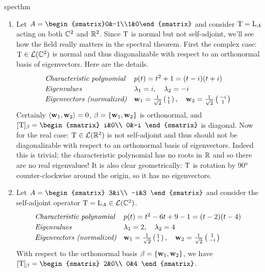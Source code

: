 \begin{examples}{}{specthm}
\begin{enumerate}
		\item Let $A=\begin{smatrix}0&-1\\1&0\end{smatrix}$ and consider $\mathrm{T}=\mathrm{L}_A$ acting on both $\mathbb{C}^2$ and $\mathbb{R}^2$. Since $\mathrm{T}$ is normal but not self-adjoint, we'll see how the field really matters in the spectral theorem.\smallbreak
		First the complex case: $\mathrm{T}\in\mathcal{L}(\mathbb{C}^2)$ is normal and thus diagonalizable with respect to an orthonormal basis of eigenvectors. Here are the details.
		\[
			\def\arraystretch{1.2}
			\begin{array}{@{}ll}
				\text{\emph{Characteristic polynomial}} &p(t)=t^2+1=(t-i)(t+i)\\
				\text{\emph{Eigenvalues}} &\lambda_1=i,\quad \lambda_2=-i\\
				\text{\emph{Eigenvectors (normalized)}} &\vw_1=\frac 1{\sqrt{2}}\stwovec{i}{1},\quad \vw_2=\frac 1{\sqrt{2}}\stwovec{-i}{1}
			\end{array}
		\]
		Certainly $\left\langle {\mathbf{w}}_1,{\mathbf{w}}_2\right\rangle=0$, $\beta=\{{\mathbf{w}}_1,{\mathbf{w}}_2\}$ is orthonormal, and $[\rT]_\beta=
		\begin{smatrix}
			i&0\\
			0&-i
		\end{smatrix}$
		is diagonal.\smallbreak	
		Now for the real case: $\mathrm{T}\in\mathcal{L}(\mathbb{R}^2)$ is not self-adjoint and thus should not be diagonalizable with respect to an orthonormal basis of eigenvectors. Indeed this is trivial; the characteristic polynomial has no roots in $\mathbb{R}$ and so there are no real eigenvalues! It is also clear geometrically: $\mathrm{T}$ is rotation by \ang{90} counter-clockwise around the origin, so it has no eigenvectors.
		
		\item Let $A=
		\begin{smatrix}
			3&i\\
			-i&3
		\end{smatrix}$ and consider the self-adjoint operator $\mathrm{T}=\mathrm{L}_A\in\mathcal{L}(\mathbb{C}^2)$.
		\[
			\def\arraystretch{1.2}
			\begin{array}{@{}ll}
				\text{\emph{Characteristic polynomial}} &p(t)=t^2-6t+9-1=(t-2)(t-4)\\
				\text{\emph{Eigenvalues}} &\lambda_1=2,\quad \lambda_2=4\\
				\text{\emph{Eigenvectors (normalized)}} &\vw_1=\frac 1{\sqrt{2}}\stwovec{1}{i},\quad \vw_2=\frac 1{\sqrt{2}}\stwovec{1}{-i}
			\end{array}
		\]
		With respect to the orthonormal basis $\beta=\{{\mathbf{w}}_1,{\mathbf{w}}_2\}$, we have $[\rT]_\beta=
		\begin{smatrix}
			2&0\\
			0&4
		\end{smatrix}$.
	\end{enumerate}
\end{examples}


